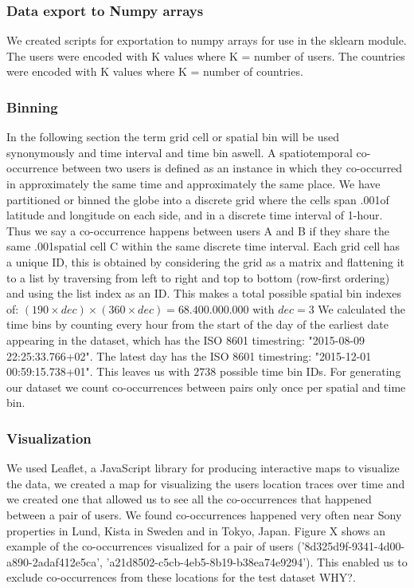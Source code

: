 \subsubsection{Data export to Numpy arrays}
We created scripts for exportation to numpy arrays for use in the sklearn module. The users were encoded with K values where K = number of users. The countries were encoded with K values where K = number of countries.
\subsubsection{Binning} \label{ssec:binning}
In the following section the term grid cell or spatial bin will be used synonymously and time interval and time bin aswell.
A spatiotemporal co-occurrence between two users is defined as an instance in which they co-occurred in approximately the same time and approximately the same place.
We have partitioned or binned the globe into a discrete grid where the cells span .001\degree of latitude and longitude on each side, and in a discrete time interval of 1-hour.
Thus we say a co-occurrence happens between users A and B if they share the same .001\degree spatial cell C within the same discrete time interval.
 Each grid cell has a unique ID, this is obtained by considering the grid as a matrix and flattening it to a list by traversing from left to right and top to bottom (row-first ordering) and using the list index as an ID. This makes a total possible spatial bin indexes of: $(190\times dec)\times(360\times dec)=68.400.000.000$ with $dec=3$ We calculated the time bins by counting every hour from the start of the day of the earliest date appearing in the dataset, which has the ISO 8601 timestring: "2015-08-09 22:25:33.766+02". The latest day has the ISO 8601 timestring: "2015-12-01 00:59:15.738+01". This leaves us with $2738$ possible time bin IDs. For generating our dataset we count co-occurrences between pairs only once per spatial and time bin.

\subsubsection{Visualization}
We used Leaflet\cite{leaflet}, a JavaScript library for producing interactive maps to visualize the data, we created a map for visualizing the users location traces over time and we created one that allowed us to see all the co-occurrences that happened between a pair of users. We found co-occurrences happened very often near Sony properties in Lund\cite{sony_headquarters_sweden_lund}, Kista\cite{sony_headquarters_sweden_kista} in Sweden and in Tokyo\cite{sony_headquarters_japan}, Japan. Figure X shows an example of the co-occurrences visualized for a pair of users ('8d325d9f-9341-4d00-a890-2adaf412e5ca', 'a21d8502-c5cb-4eb5-8b19-b38ea74e9294'). This enabled us to exclude co-occurrences from these locations for the test dataset {\color{red} WHY?}.

